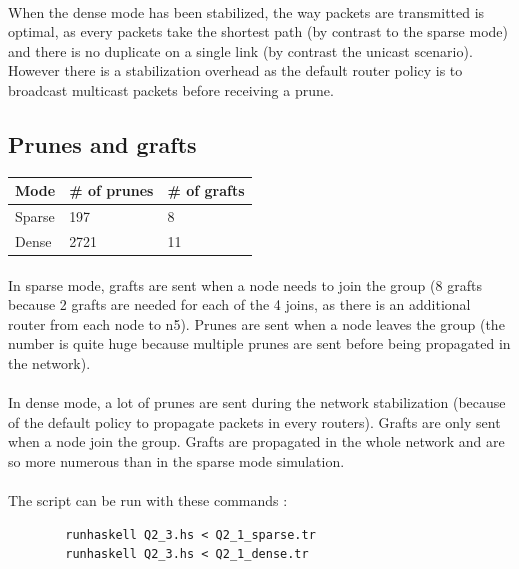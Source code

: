 \documentclass[a4paper]{article}
\begin{document}
    \paragraph{}When the dense mode has been stabilized, the way packets are
transmitted is optimal, as every packets take the shortest path (by contrast to
the sparse mode) and there is no duplicate on a single link (by contrast the
unicast scenario).
\newline However there is a stabilization overhead as the default router policy
is to broadcast multicast packets before receiving a prune.

  \subsection{Prunes and grafts}

    \begin{center}
        \begin{tabular}{|l|l|l|}
            \hline
            Mode   & \# of prunes & \# of grafts \\
            \hline
            Sparse & 197          & 8 \\
            Dense  & 2721         & 11 \\
            \hline
        \end{tabular}
    \end{center}

    \paragraph{}In sparse mode, grafts are sent when a node needs to join the
group (8 grafts because 2 grafts are needed for each of the 4 joins, as
there is an additional router from each node to n5).
\newline Prunes are sent when a node leaves the group (the number is quite huge
because multiple prunes are sent before being propagated in the network).

    \paragraph{}In dense mode, a lot of prunes are sent during the network
stabilization (because of the default policy to propagate packets in every
routers). Grafts are only sent when a node join the group. Grafts are propagated
in the whole network and are so more numerous than in the sparse mode
simulation.

    \paragraph{}The script can be run with these commands :
    \begin{verbatim}
        runhaskell Q2_3.hs < Q2_1_sparse.tr
        runhaskell Q2_3.hs < Q2_1_dense.tr
    \end{verbatim}
\end{document}
